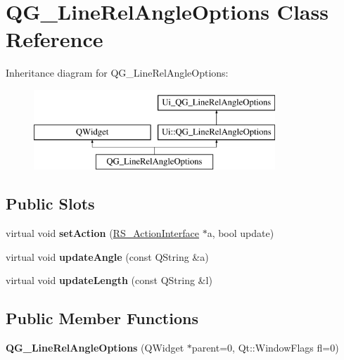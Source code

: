 \hypertarget{classQG__LineRelAngleOptions}{\section{Q\-G\-\_\-\-Line\-Rel\-Angle\-Options Class Reference}
\label{classQG__LineRelAngleOptions}
}
Inheritance diagram for Q\-G\-\_\-\-Line\-Rel\-Angle\-Options\-:\begin{figure}[H]
\begin{center}
\leavevmode
\includegraphics[height=3.000000cm]{classQG__LineRelAngleOptions}
\end{center}
\end{figure}
\subsection*{Public Slots}
\begin{DoxyCompactItemize}
\item 
\hypertarget{classQG__LineRelAngleOptions_a62e7e014dbbc1dcc2212dc3f7faeb2c0}{virtual void {\bfseries set\-Action} (\hyperlink{classRS__ActionInterface}{R\-S\-\_\-\-Action\-Interface} $\ast$a, bool update)}\label{classQG__LineRelAngleOptions_a62e7e014dbbc1dcc2212dc3f7faeb2c0}

\item 
\hypertarget{classQG__LineRelAngleOptions_a2dfb3e51d5a0b5b5fea198276099e8c0}{virtual void {\bfseries update\-Angle} (const Q\-String \&a)}\label{classQG__LineRelAngleOptions_a2dfb3e51d5a0b5b5fea198276099e8c0}

\item 
\hypertarget{classQG__LineRelAngleOptions_a0e9399eaaee0c703d23756d79be45623}{virtual void {\bfseries update\-Length} (const Q\-String \&l)}\label{classQG__LineRelAngleOptions_a0e9399eaaee0c703d23756d79be45623}

\end{DoxyCompactItemize}
\subsection*{Public Member Functions}
\begin{DoxyCompactItemize}
\item 
\hypertarget{classQG__LineRelAngleOptions_ae32e3544d28b3242d5244ebad0351e93}{{\bfseries Q\-G\-\_\-\-Line\-Rel\-Angle\-Options} (Q\-Widget $\ast$parent=0, Qt\-::\-Window\-Flags fl=0)}\label{classQG__LineRelAngleOptions_ae32e3544d28b3242d5244ebad0351e93}

\end{DoxyCompactItemize}
